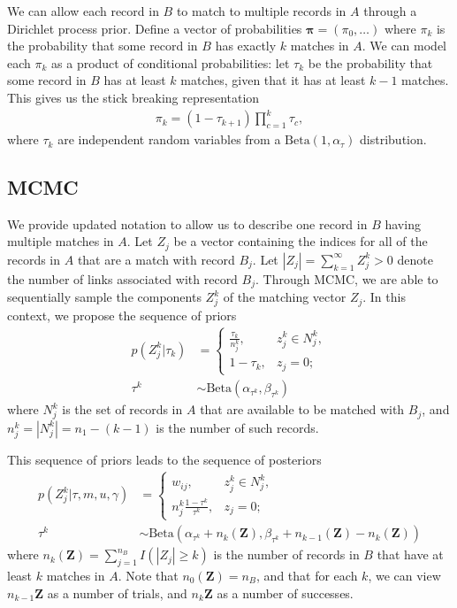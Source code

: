 \documentclass[12pt,letterpaper]{article}
\newcommand{\1}[1]{\mathbb{I}\!\left[#1\right]} %
\begin{document}
We can allow each record in $B$ to match to multiple records in $A$ through a Dirichlet process prior. Define a vector of probabilities $\bm{\pi} = (\pi_0, \ldots)$ where $\pi_k$ is the probability that some record in $B$ has exactly $k$ matches in $A$. We can model each $\pi_k$ as a product of conditional probabilities: let $\tau_k$ be the probability that some record in $B$ has at least $k$ matches, given that it has at least $k-1$ matches. This gives us the stick breaking representation
\begin{align}
	\pi_k = (1 - \tau_{k+1}) \prod_{c=1}^{k} \tau_c, 
\end{align}
where $\tau_k$ are independent random variables from a $\text{Beta}(1, \alpha_{\tau})$ distribution. 

\subsection{MCMC}
We provide updated notation to allow us to describe one record in $B$ having multiple matches in $A$. Let $Z_j$ be a vector containing the indices for all of the records in $A$ that are a match with record $B_j$. Let $|Z_j| = \sum_{k=1}^{\infty} Z_j^k > 0$ denote the number of links associated with record $B_j$. Through MCMC, we are able to sequentially sample the components $Z_j^k$ of the matching vector $Z_j$. In this context, we propose the sequence of priors
\begin{align}
	p(Z_j^k|\tau_k) &= \begin{cases}
		\frac{\tau_k}{n_j^k}, &  z_j^k \in N_j^k, \\
		1 - \tau_k, & z_j = 0;
		\end{cases} \\
	\tau^k &\sim \text{Beta}(\alpha_{\tau^k}, \beta_{\tau^k})
\end{align}
where $N_j^k$ is the set of records in $A$ that are available to be matched with $B_j$, and $n_j^k = |N_j^k| = n_1 - (k - 1)$ is the number of such records. 

This sequence of priors leads to the sequence of posteriors
\begin{align}
	p(Z_j^k|\tau, m, u, \gamma) &= \begin{cases}
		w_{ij}, &z_j^k \in N_j^k, \\
		n_j^k \frac{1 - \tau^k}{\tau^k}, & z_j = 0;
	\end{cases} \\
	\tau^k &\sim \text{Beta}(\alpha_{\tau^k} + n_k(\bm{Z}), \beta_{\tau^k} + n_{k-1}(\bm{Z}) - n_k(\bm{Z}))
\end{align}
where $n_k(\bm{Z}) = \sum_{j=1}^{n_B} I( |Z_j| \geq k)$ is the number of records in $B$ that have at least $k$ matches in $A$. Note that $n_0(\bm{Z}) = n_B$, and that for each $k$, we can view $n_{k-1}{\bm{Z}}$ as a number of trials, and $n_{k}{\bm{Z}}$ as a number of successes. 
\end{document}
